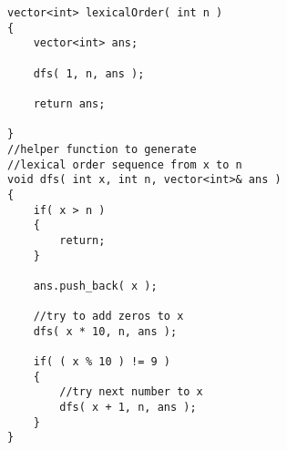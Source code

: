 \setcounter{lstlisting}{0}
\begin{lstlisting}[style=customc, caption={DFS}]
vector<int> lexicalOrder( int n )
{
    vector<int> ans;

    dfs( 1, n, ans );

    return ans;

}
//helper function to generate
//lexical order sequence from x to n
void dfs( int x, int n, vector<int>& ans )
{
    if( x > n )
    {
        return;
    }

    ans.push_back( x );

    //try to add zeros to x
    dfs( x * 10, n, ans );

    if( ( x % 10 ) != 9 )
    {
        //try next number to x
        dfs( x + 1, n, ans );
    }
}
\end{lstlisting}